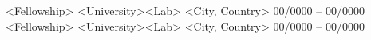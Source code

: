 \begin{cvhonors}
	\cvhonor
	{<Fellowship>}
	{<University>\enskip\cdotp\enskip <Lab>}
	{<City, Country>}
	{00/0000 -- 00/0000}
	\cvhonor
	{<Fellowship>}
	{<University>\enskip\cdotp\enskip <Lab>}
	{<City, Country>}
	{00/0000 -- 00/0000}
\end{cvhonors}
